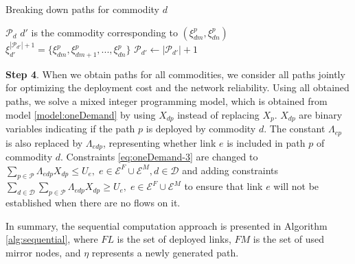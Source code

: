 \documentclass[onecolumn,11pt,draftclsnofoot]{IEEEtran}
\begin{document}
\begin{algorithm}
\caption{Breaking down paths for commodity $d$}
\label{alg:breakDown}
\begin{algorithmic}[1]
\REQUIRE $\mathcal P_d$
                    \STATE $d'$ is the commodity corresponding to $(\xi^p_{dm},\xi^p_{dn})$
                        \STATE  $\xi^{|\mathcal P_{d'}|+1}_{d'} = \{\xi^p_{dm},\xi^p_{dm+1},...,  \xi^p_{dn}\}$
                        \STATE $\mathcal P_{d'} \leftarrow |\mathcal P_{d'}| +1$
                    \ENDIF
                \ENDIF
            \ENDFOR
        \ENDFOR
    \ENDFOR
\end{algorithmic}
\end{algorithm}

\textbf{Step 4}. When we obtain paths for all commodities, we consider all paths jointly for optimizing the deployment cost and the network reliability. Using all obtained paths, we solve a mixed integer programming model, which is obtained from model \eqref{model:oneDemand} by using $X_{dp}$ instead of replacing $X_{p}$. $X_{dp}$ are binary variables indicating if the path $p$ is deployed by commodity $d$. The constant $\Lambda_{ep}$ is also replaced by $\Lambda_{edp}$, representing whether link $e$ is included in path $p$ of commodity $d$.
Constraints \eqref{eq:oneDemand-3} are changed to $\mbox{$\sum_{p \in \mathcal P} \Lambda_{edp} X_{dp} \leq U_{e}, \; e \in \mathcal E^F \cup \mathcal E^M, d \in \mathcal D$}$ and adding constraints $\mbox{$\sum_{d \in \mathcal D} \sum_{p \in \mathcal P} \Lambda_{edp} X_{dp} \geq U_{e}, \; e \in \mathcal E^F \cup \mathcal E^M$}$ to ensure that link $e$ will not be established when there are no flows on it.

In summary, the sequential computation approach is presented in Algorithm \ref{alg:sequential}, where $FL$ is the set of deployed links, $FM$ is the set of used mirror nodes, and $\eta$ represents a newly generated path.
\end{document}
